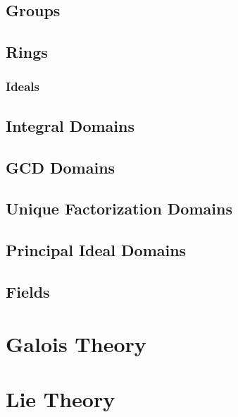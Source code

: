 \documentclass[12pt, english]{book}
\begin{document}
	\chapter{Groups} \label{Groups Chapter - Abstract Algebra}
	
	
	\chapter{Rings} \label{Rings Chapter - Abstract Algebra}
	
	\section{Ideals} \label{Ideals Section - Abstract Algebra}
	
	\chapter{Integral Domains} \label{Integral Domains Chapter - Abstract Algebra}
	
	\chapter{GCD Domains} \label{GCD Domains Chapter - Abstract Algebra}
	
	\chapter{Unique Factorization Domains} \label{Unique Factorization Domains Chapter - Abstract Algebra}
	
	\chapter{Principal Ideal Domains} \label{Principal Ideal Domains Chapter - Abstract Algebra}
	
	\chapter{Fields} \label{Fields Chapter - Abstract Algebra}
	
	
	\part{Galois Theory} \label{Galois Theory Part}
	
	\part{Lie Theory} \label{Lie Algebra Part}
	
\end{document}
